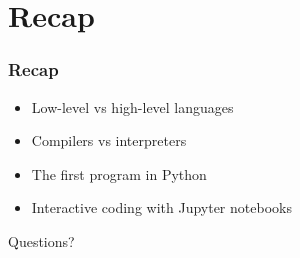 \documentclass{beamer}
\begin{document}
\section{Recap}
\begin{frame}[fragile]
  \frametitle{Recap}
  \begin{itemize}
  \item Low-level vs high-level languages\pause
  \item Compilers vs interpreters\pause
  \item The first program in Python\pause
  \item Interactive coding with Jupyter notebooks\pause
  \end{itemize}
  \begin{block}{}
  \begin{center}Questions?\end{center}
  \end{block}
\end{frame}


\end{document}
